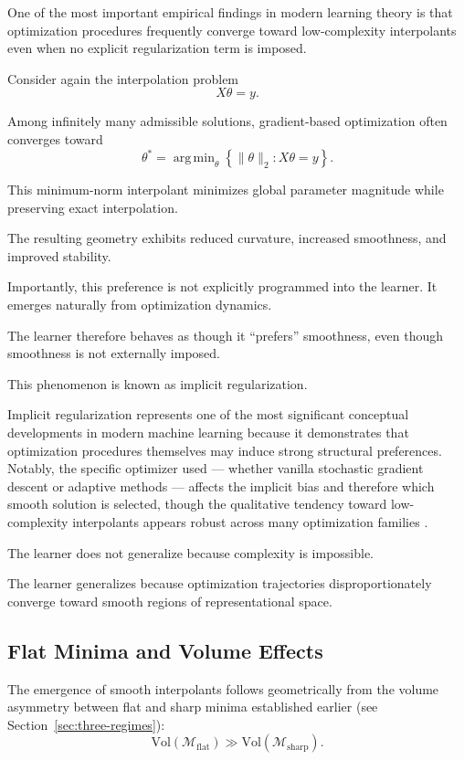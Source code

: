 \documentclass[12pt,a4paper]{article}
\DeclareMathOperator*{\argmin}{arg\,min}
\begin{document}
One of the most important empirical findings in modern learning theory is that optimization procedures frequently converge toward low-complexity interpolants even when no explicit regularization term is imposed.

Consider again the interpolation problem
\[
X\theta = y.
\]

Among infinitely many admissible solutions, gradient-based optimization often converges toward
\[
\theta^\ast
=
\argmin_\theta
\left\{
\|\theta\|_2
:
X\theta = y
\right\}.
\]

This minimum-norm interpolant minimizes global parameter magnitude while preserving exact interpolation.

The resulting geometry exhibits reduced curvature, increased smoothness, and improved stability.

Importantly, this preference is not explicitly programmed into the learner. It emerges naturally from optimization dynamics.

The learner therefore behaves as though it ``prefers'' smoothness, even though smoothness is not externally imposed.

This phenomenon is known as implicit regularization.

Implicit regularization represents one of the most significant conceptual developments in modern machine learning because it demonstrates that optimization procedures themselves may induce strong structural preferences. Notably, the specific optimizer used — whether vanilla stochastic gradient descent or adaptive methods — affects the implicit bias and therefore which smooth solution is selected, though the qualitative tendency toward low-complexity interpolants appears robust across many optimization families \cite{Wilson2017}.

The learner does not generalize because complexity is impossible.

The learner generalizes because optimization trajectories disproportionately converge toward smooth regions of representational space.

\subsection{Flat Minima and Volume Effects}

The emergence of smooth interpolants follows geometrically from the volume asymmetry between flat and sharp minima established earlier (see Section~\ref{sec:three-regimes}):
\[
\text{Vol}(\mathcal{M}_{\text{flat}})
\gg
\text{Vol}(\mathcal{M}_{\text{sharp}}).
\]
\end{document}
